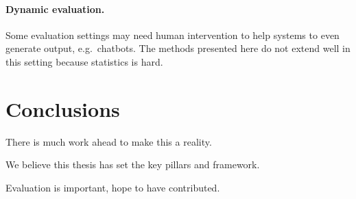 \paragraph{Dynamic evaluation.}
Some evaluation settings may need human intervention to help systems to even generate output, e.g.\ chatbots.
The methods presented here do not extend well in this setting because statistics is hard.

\section{Conclusions}
There is much work ahead to make this a reality.

We believe this thesis has set the key pillars and framework.

Evaluation is important, hope to have contributed.

